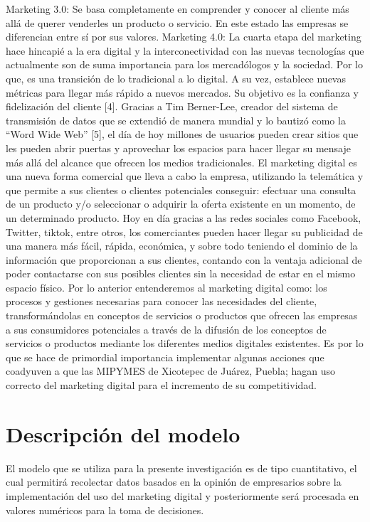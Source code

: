 \documentclass[12pt]{difu100cia} %
\begin{document}
Marketing 3.0: Se basa completamente en comprender y conocer al cliente más allá de querer venderles un producto o servicio. En este estado las empresas se diferencian entre sí por sus valores. 
Marketing 4.0: La cuarta etapa del marketing hace hincapié a la era digital y la interconectividad con las nuevas tecnologías que actualmente son de suma importancia para los mercadólogos y la sociedad. Por lo que, es una transición de lo tradicional a lo digital. A su vez, establece nuevas métricas para llegar más rápido a nuevos mercados. Su objetivo es la confianza y fidelización del cliente [4].
Gracias a Tim Berner-Lee, creador del sistema de transmisión de datos que se extendió de manera mundial y lo bautizó como la “Word Wide Web” [5], el día de hoy millones de usuarios pueden crear sitios que les pueden abrir puertas y aprovechar los espacios para hacer llegar su mensaje más allá del alcance que ofrecen los medios tradicionales. 
El marketing digital es una nueva forma comercial que lleva a cabo la empresa, utilizando la telemática y que permite a sus clientes o clientes potenciales conseguir: efectuar una consulta de un producto y/o seleccionar o adquirir la oferta existente en un momento, de un determinado producto. 
Hoy en día gracias a las redes sociales como Facebook, Twitter, tiktok, entre otros, los comerciantes pueden hacer llegar su publicidad de una manera más fácil, rápida, económica, y sobre todo teniendo el dominio de la información que proporcionan a sus clientes, contando con la ventaja adicional de poder contactarse con sus posibles clientes sin la necesidad de estar en el mismo espacio físico. 
Por lo anterior entenderemos al marketing digital como: los procesos y gestiones necesarias para conocer las necesidades del cliente, transformándolas en conceptos de servicios o productos que ofrecen las empresas a sus consumidores potenciales a través de la difusión de los conceptos de servicios o productos mediante los diferentes medios digitales existentes. Es por lo que se hace de primordial importancia implementar algunas acciones que coadyuven a que las MIPYMES de Xicotepec de Juárez, Puebla; hagan uso correcto del marketing digital para el incremento de su competitividad.

\section{Descripción del modelo}

El modelo que se utiliza para la presente investigación es de tipo cuantitativo, el cual permitirá recolectar datos basados en la opinión de empresarios sobre la implementación del uso del marketing digital y posteriormente será procesada en valores numéricos para la toma de decisiones. 
\end{document}
